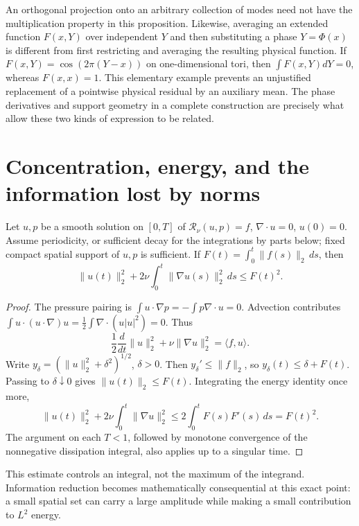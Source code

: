 An orthogonal projection onto an arbitrary collection of modes need not have
the multiplication property in this proposition. Likewise, averaging an
extended function $F(x,Y)$ over independent $Y$ and then substituting a phase
$Y=\Phi(x)$ is different from first restricting and averaging the resulting
physical function. If $F(x,Y)=\cos(2\pi(Y-x))$ on one-dimensional tori,
then $\int F(x,Y)dY=0$, whereas $F(x,x)=1$. This elementary example prevents
an unjustified replacement of a pointwise physical residual by an auxiliary
mean. The phase derivatives and support geometry in a complete construction
are precisely what allow these two kinds of expression to be related.

\section{Concentration, energy, and the information lost by norms}

\begin{proposition}
\label{prop:ns-force-energy}
Let $u,p$ be a smooth solution on $[0,T]$ of
$\mathcal R_\nu(u,p)=f$, $\nabla\cdot u=0$, $u(0)=0$.
Assume periodicity, or sufficient decay for the integrations by parts
below; fixed compact spatial support of $u,p$ is sufficient. If
$F(t)=\int_0^t\|f(s)\|_2\,ds$, then
\[
 \|u(t)\|_2^2+2\nu\int_0^t\|\nabla u(s)\|_2^2\,ds\leq F(t)^2.
\]
\end{proposition}
\begin{proof}
The pressure pairing is
$\int u\cdot\nabla p=-\int p\nabla\cdot u=0$.
Advection contributes
$\int u\cdot(u\cdot\nabla)u=
\frac12\int\nabla\cdot(u|u|^2)=0$. Thus
\[
 \frac12\frac d{dt}\|u\|_2^2+\nu\|\nabla u\|_2^2=\langle f,u\rangle.
\]
Write $y_\delta=(\|u\|_2^2+\delta^2)^{1/2}$, $\delta>0$.
Then $y_\delta'\leq\|f\|_2$, so
$y_\delta(t)\leq\delta+F(t)$. Passing to $\delta\downarrow0$ gives
$\|u(t)\|_2\leq F(t)$. Integrating the energy identity once more,
\[
 \|u(t)\|_2^2+2\nu\int_0^t\|\nabla u\|_2^2
 \leq2\int_0^t F(s)F'(s)\,ds=F(t)^2.
\]
The argument on each $T<1$, followed by monotone convergence of the
nonnegative dissipation integral, also applies up to a singular time.
\end{proof}

This estimate controls an integral, not the maximum of the integrand.
Information reduction becomes mathematically consequential at this exact
point: a small spatial set can carry a large amplitude while making a small
contribution to $L^2$ energy.

